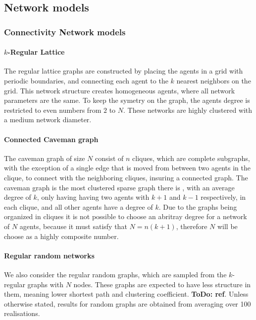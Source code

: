 \documentclass[fleqn,10pt]{wlscirep}
\newcommand{\TODO}[1]{{\bf {\color{red} ToDo:} #1}}
\begin{document}
\subsection*{Network models}


\subsubsection*{Connectivity Network models }

\paragraph{$k$-Regular Lattice}
The regular lattice graphs are constructed by placing the agents in a grid with periodic boundaries, and connecting each agent to the $k$ nearest neighbors on the grid. This network structure creates homogeneous agents, where all network parameters are the same. To keep the symetry on the graph, the agents degree is restricted to even numbers from $2$ to $N$.  These networks are highly clustered with a medium network diameter.

\paragraph{Connected Caveman graph}

The caveman graph of size $N$ consist of $n$ cliques, which are complete subgraphs, with the exception of a single edge that is moved from between two agents in the clique, to connect with the neighboring cliques, insuring a connected graph. The caveman graph is the most clustered sparse graph there is \cite{Watts99}, with an average degree of $k$, only having having two agents with $k + 1$ and  $k-1$ respectively, in each clique, and all other agents have a degree of $k$. Due to the graphs being organized in cliques it is not possible to choose an abritray degree for a network of $N$ agents, because it must satisfy that $N=n(k+1)$, therefore $N$ will be choose as a highly composite number.

\paragraph{Regular random networks}

We also consider the regular random graphs, which are sampled from the $k$-regular graphs with $N$ nodes. These graphs are expected to have less structure in them, meaning lower shortest path and clustering coefficient. \TODO{ref}. Unless otherwise stated, results for random graphs are obtained from averaging over 100 realisations.
\end{document}
